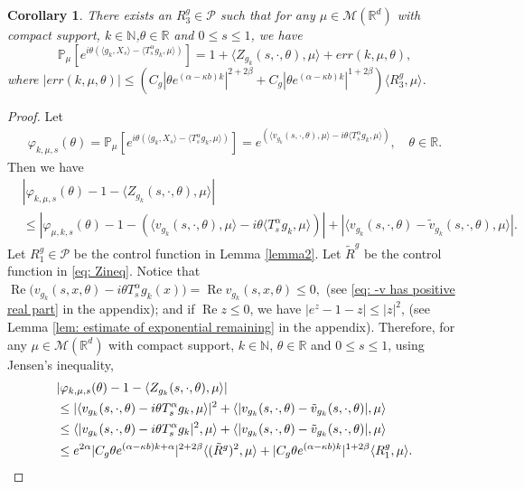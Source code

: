 \documentclass[12pt,oneside,english]{amsart}
\theoremstyle{plain}
\newtheorem{cor}[thm]{Corollary}
\theoremstyle{definition}
\numberwithin{equation}{section}
\begin{document}
\begin{cor}
\label{cor: corollary1}
    There exists an $R^g_3 \in \mathcal{P}$ such that for any $\mu\in \mathcal M(\mathbb R^d)$ with compact support, $k \in \mathbb{N}$,$\theta \in \mathbb{R}$ and $0\leq s\leq 1$, we have
\[
    \mathbb P_{\mu}[e^{i\theta(\langle g_k, X_s\rangle-\langle T_s^{\alpha}g_k,\mu \rangle)}]
    =1+\langle Z_{g_k}(s,\cdot,\theta),\mu\rangle+ err(k,\mu,\theta),
\]
    where $|err(k,\mu,\theta)| \leq (C_g|\theta e^{(\alpha-\kappa b)k}|^{2+2\beta} + C_g|\theta e^{(\alpha-\kappa b)k}|^{1+2\beta} )\langle R^g_3,\mu\rangle$.
\end{cor}
\begin{proof}
    Let 
\begin{align}
\label{eq: definition of varphi-mu-k-theta}
    \varphi_{k,\mu,s}(\theta)
    =\mathbb{P}_{\mu}[e^{i\theta(\langle g_k, X_s\rangle-\langle T_s^{\alpha}g_k,\mu \rangle)}]
    =e^{(\langle v_{g_k}(s,\cdot,\theta),\mu \rangle-i\theta \langle T_s^{\alpha} g_k, \mu \rangle)},
    \quad \theta \in \mathbb R.
\end{align}
    Then we have
\begin{align*}
    &|\varphi_{k,\mu,s}(\theta)-1-\langle Z_{g_k}(s,\cdot, \theta),\mu\rangle|\\
    &\leq|\varphi_{\mu,k,s}(\theta)-1-\left( \langle v_{g_k}(s,\cdot,\theta), \mu \rangle-i\theta \langle T_s^{\alpha}g_k,\mu\rangle\right)| + |\langle v_{g_k}(s,\cdot,\theta)-\tilde{v}_{g_k}(s,\cdot,\theta),\mu \rangle|.
\end{align*}
    Let $R^g_1\in \mathcal P$ be the control function in Lemma \ref{lemma2}.
    Let $\tilde R^g$ be the control function in \eqref{eq: Zineq}.
    Notice that
$
    \operatorname{Re} \big(v_{g_k}(s,x,\theta) - i\theta T_s^\alpha g_k(x)\big)
    = \operatorname{Re} v_{g_k}(s,x,\theta)
    \leq 0,
$
    (see \eqref{eq: -v has positive real part} in the appendix); and if $ \operatorname{Re} z\leq 0$, we have $|e^z-1-z|\leq |z|^2$, (see Lemma \ref{lem: estimate of exponential remaining} in the appendix).
    Therefore, for any $\mu\in \mathcal M(\mathbb R^d)$ with compact support, $k \in \mathbb{N}$, $\theta \in \mathbb{R}$ and $0\leq s\leq1$, using Jensen's inequality,
\begin{align*}
    &|\varphi_{k,\mu,s}(\theta)-1- \langle Z_{g_k}(s,\cdot, \theta),\mu\rangle|\\
    &\leq |\langle v_{g_k}(s,\cdot,\theta)-i\theta T_s^{\alpha}g_k, \mu \rangle|^2 + \langle |v_{g_k}(s,\cdot,\theta)-\tilde{v}_{g_k}(s,\cdot,\theta)|, \mu \rangle
    \\&\leq \langle |v_{g_k}(s,\cdot,\theta)-i\theta T_s^{\alpha}g_k|^2, \mu \rangle + \langle |v_{g_k}(s,\cdot,\theta)-\tilde{v}_{g_k}(s,\cdot,\theta)|, \mu \rangle
    \\&\leq e^{2\alpha}|C_g\theta e^{(\alpha-\kappa b)k+\alpha}|^{2+2\beta}\langle (\tilde R^g)^2,\mu\rangle + |C_g\theta e^{(\alpha-\kappa b)k}|^{1+2\beta}\langle R^g_1,\mu\rangle.
    \qedhere
\end{align*}
\end{proof}
\end{document}
